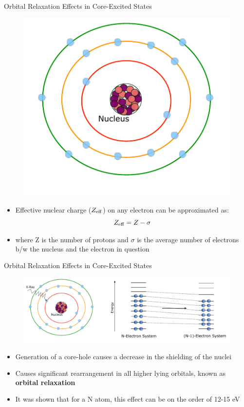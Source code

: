 \documentclass[t]{beamer}
\begin{document}
\begin{frame}{Orbital Relaxation Effects in Core-Excited States}
\begin{figure}[!t]
\includegraphics[scale=0.7]{core_hole_generation_1.pdf}
\end{figure}
\begin{itemize}
\item Effective nuclear charge ($Z_{\rm eff}$) on any electron can be approximated as:
\begin{equation}
Z_{\rm eff} = Z - \sigma
\end{equation}
\item where Z is the number of protons and $\sigma$ is the average number of electrons b/w the nucleus and the electron in question
\end{itemize}
\end{frame}

\begin{frame}{Orbital Relaxation Effects in Core-Excited States}
\begin{figure}[!t]
\includegraphics[width=\linewidth]{core_hole_generation_2.pdf}
\end{figure}
\begin{itemize}
\item Generation of a core-hole causes a decrease in the shielding of the nuclei 
\item Causes significant rearrangement in all higher lying orbitals, known as \textbf{orbital relaxation}
\item It was shown that for a N atom, this effect can be on the order of 12-15 eV\footnotemark
\end{itemize}
\end{frame}
\end{document}
